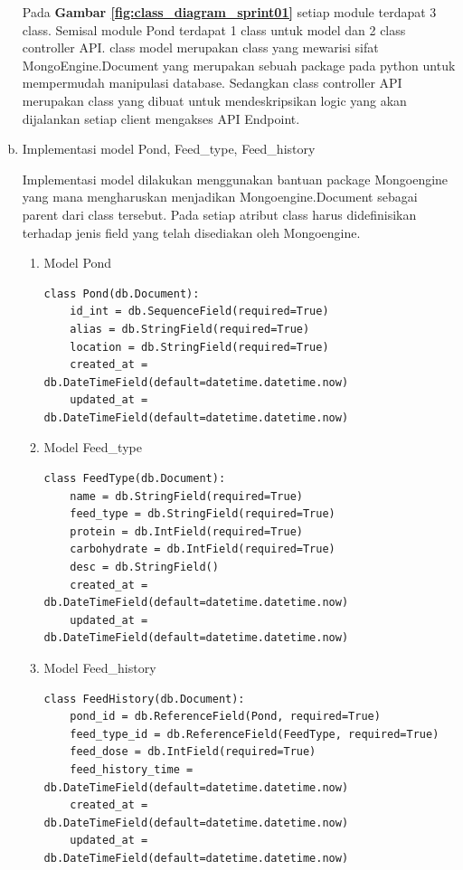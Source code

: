 \begin{enumerate}[a).]
	Pada \textbf{Gambar \ref{fig:class_diagram_sprint01}} setiap module terdapat 3 class. Semisal module Pond terdapat 1 class untuk model dan 2 class controller API. class model merupakan class yang mewarisi sifat MongoEngine.Document yang merupakan sebuah package pada python untuk mempermudah manipulasi database. Sedangkan class controller API merupakan class yang dibuat untuk mendeskripsikan logic yang akan dijalankan setiap client mengakses API Endpoint.
	
	\item{Implementasi model Pond, Feed\_type, Feed\_history}
	
	Implementasi model dilakukan menggunakan bantuan package Mongoengine yang mana mengharuskan menjadikan Mongoengine.Document sebagai parent dari class tersebut. Pada setiap atribut class harus didefinisikan terhadap jenis field yang telah disediakan oleh Mongoengine.
	
	\begin{enumerate}[1).]
		\item{Model Pond}
			\begin{lstlisting}
class Pond(db.Document):
    id_int = db.SequenceField(required=True)
    alias = db.StringField(required=True)
    location = db.StringField(required=True)
    created_at = db.DateTimeField(default=datetime.datetime.now)
    updated_at = db.DateTimeField(default=datetime.datetime.now)
			\end{lstlisting}
		\item{Model Feed\_type}
			\begin{lstlisting}
class FeedType(db.Document):
    name = db.StringField(required=True)
    feed_type = db.StringField(required=True)
    protein = db.IntField(required=True)
    carbohydrate = db.IntField(required=True)
    desc = db.StringField()
    created_at = db.DateTimeField(default=datetime.datetime.now)
    updated_at = db.DateTimeField(default=datetime.datetime.now)
			\end{lstlisting}
		\item{Model Feed\_history}
			\begin{lstlisting}
class FeedHistory(db.Document):
    pond_id = db.ReferenceField(Pond, required=True)
    feed_type_id = db.ReferenceField(FeedType, required=True)
    feed_dose = db.IntField(required=True)
    feed_history_time = db.DateTimeField(default=datetime.datetime.now)
    created_at = db.DateTimeField(default=datetime.datetime.now)
    updated_at = db.DateTimeField(default=datetime.datetime.now)
    			\end{lstlisting}
	\end{enumerate}
	

\end{enumerate}
